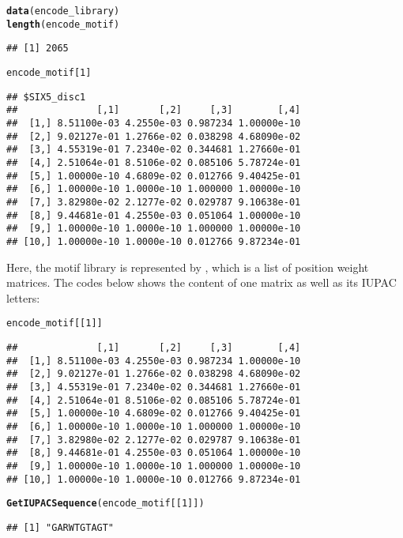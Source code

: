 \documentclass[a4paper,10pt]{article}\usepackage[]{graphicx}\usepackage[]{color}
\makeatletter
\newcommand{\hlnum}[1]{\textcolor[rgb]{0.686,0.059,0.569}{#1}}%
\newcommand{\hlstd}[1]{\textcolor[rgb]{0.345,0.345,0.345}{#1}}%
\newcommand{\hlkwd}[1]{\textcolor[rgb]{0.737,0.353,0.396}{\textbf{#1}}}%
\newenvironment{kframe}{%
 \def\at@end@of@kframe{}%
 \ifinner\ifhmode%
  \def\at@end@of@kframe{\end{minipage}}%
  \begin{minipage}{\columnwidth}%
 \fi\fi%
 \def\FrameCommand##1{\hskip\@totalleftmargin \hskip-\fboxsep
 \colorbox{shadecolor}{##1}\hskip-\fboxsep
     \hskip-\linewidth \hskip-\@totalleftmargin \hskip\columnwidth}%
 \MakeFramed {\advance\hsize-\width
   \@totalleftmargin\z@ \linewidth\hsize
   \@setminipage}}%
 {\par\unskip\endMakeFramed%
 \at@end@of@kframe}
\newenvironment{knitrout}{}{} %
\makeatother
\begin{document}
\begin{knitrout}
\color{fgcolor}\begin{kframe}
\begin{alltt}
\hlkwd{data}\hlstd{(encode_library)}
\hlkwd{length}\hlstd{(encode_motif)}
\end{alltt}
\begin{verbatim}
## [1] 2065
\end{verbatim}
\begin{alltt}
\hlstd{encode_motif[}\hlnum{1}\hlstd{]}
\end{alltt}
\begin{verbatim}
## $SIX5_disc1
##              [,1]       [,2]     [,3]        [,4]
##  [1,] 8.51100e-03 4.2550e-03 0.987234 1.00000e-10
##  [2,] 9.02127e-01 1.2766e-02 0.038298 4.68090e-02
##  [3,] 4.55319e-01 7.2340e-02 0.344681 1.27660e-01
##  [4,] 2.51064e-01 8.5106e-02 0.085106 5.78724e-01
##  [5,] 1.00000e-10 4.6809e-02 0.012766 9.40425e-01
##  [6,] 1.00000e-10 1.0000e-10 1.000000 1.00000e-10
##  [7,] 3.82980e-02 2.1277e-02 0.029787 9.10638e-01
##  [8,] 9.44681e-01 4.2550e-03 0.051064 1.00000e-10
##  [9,] 1.00000e-10 1.0000e-10 1.000000 1.00000e-10
## [10,] 1.00000e-10 1.0000e-10 0.012766 9.87234e-01
\end{verbatim}
\end{kframe}
\end{knitrout}

Here, the motif library is represented by ,
which is a list of position weight matrices. The codes below shows the
content of one matrix as well as its IUPAC letters:

\begin{knitrout}
\color{fgcolor}\begin{kframe}
\begin{alltt}
\hlstd{encode_motif[[}\hlnum{1}\hlstd{]]}
\end{alltt}
\begin{verbatim}
##              [,1]       [,2]     [,3]        [,4]
##  [1,] 8.51100e-03 4.2550e-03 0.987234 1.00000e-10
##  [2,] 9.02127e-01 1.2766e-02 0.038298 4.68090e-02
##  [3,] 4.55319e-01 7.2340e-02 0.344681 1.27660e-01
##  [4,] 2.51064e-01 8.5106e-02 0.085106 5.78724e-01
##  [5,] 1.00000e-10 4.6809e-02 0.012766 9.40425e-01
##  [6,] 1.00000e-10 1.0000e-10 1.000000 1.00000e-10
##  [7,] 3.82980e-02 2.1277e-02 0.029787 9.10638e-01
##  [8,] 9.44681e-01 4.2550e-03 0.051064 1.00000e-10
##  [9,] 1.00000e-10 1.0000e-10 1.000000 1.00000e-10
## [10,] 1.00000e-10 1.0000e-10 0.012766 9.87234e-01
\end{verbatim}
\begin{alltt}
\hlkwd{GetIUPACSequence}\hlstd{(encode_motif[[}\hlnum{1}\hlstd{]])}
\end{alltt}
\begin{verbatim}
## [1] "GARWTGTAGT"
\end{verbatim}
\end{kframe}
\end{knitrout}
\end{document}
